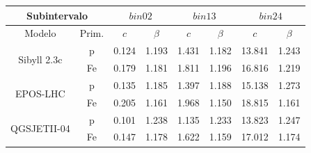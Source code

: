 \documentclass[11pt,table,compress]{beamer}
\begin{document}
\begin{frame}
\begin{footnotesize}
\begin{table}[]
\begin{tabular}{cc|cc|cc|cc}
		
		\end{tabular}
		\label{edistlat_binparams}
		\end{table}	
		\begin{table}[] 
			\centering
			\begin{tabular}{cc|cc|cc|cc}
			\hline
			\multicolumn{2}{c|}{Subintervalo}                          & \multicolumn{2}{c|}{$bin02$} & \multicolumn{2}{c|}{$bin13$} & \multicolumn{2}{c}{$bin24$} \\ \hline
			\multicolumn{1}{c|}{Modelo}                       & Prim. & $c$          & $\beta$       & $c$          & $\beta$       & $c$          & $\beta$       \\ \hline
			\multicolumn{1}{c|}{\multirow{2}{*}{Sibyll 2.3c}} & p     & 0.124        & 1.193         & 1.431        & 1.182         & 13.841       & 1.243         \\
			\multicolumn{1}{c|}{}                             & Fe    & 0.179        & 1.181         & 1.811        & 1.196         & 16.816       & 1.219         \\ \hline
			\multicolumn{1}{c|}{\multirow{2}{*}{EPOS-LHC}}    & p     & 0.135        & 1.185         & 1.397        & 1.188         & 15.138       & 1.273         \\
			\multicolumn{1}{c|}{}                             & Fe    & 0.205        & 1.161         & 1.968        & 1.150         & 18.815       & 1.161         \\ \hline
			\multicolumn{1}{c|}{\multirow{2}{*}{QGSJETII-04}} & p     & 0.101        & 1.238         & 1.135        & 1.233         & 13.823       & 1.247         \\
			\multicolumn{1}{c|}{}                             & Fe    & 0.147        & 1.178         & 1.622        & 1.159         & 17.012       & 1.174         \\ \hline
			\end{tabular}
			\label{mudistlat_binparams}
		\end{table}
 		\end{footnotesize}

	\end{frame}
			
\end{document}
